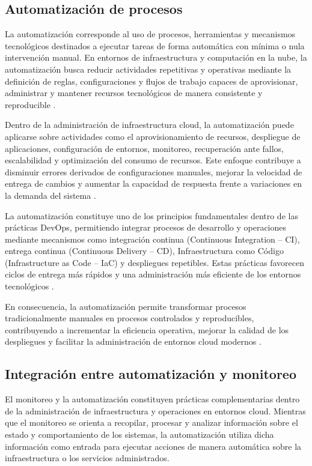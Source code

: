 \subsection{Automatización de procesos}

La automatización corresponde al uso de procesos, herramientas y mecanismos tecnológicos destinados a ejecutar tareas de forma automática con mínima o nula intervención manual. En entornos de infraestructura y computación en la nube, la automatización busca reducir actividades repetitivas y operativas mediante la definición de reglas, configuraciones y flujos de trabajo capaces de aprovisionar, administrar y mantener recursos tecnológicos de manera consistente y reproducible \parencite{RedHat2026}.

Dentro de la administración de infraestructura cloud, la automatización puede aplicarse sobre actividades como el aprovisionamiento de recursos, despliegue de aplicaciones, configuración de entornos, monitoreo, recuperación ante fallos, escalabilidad y optimización del consumo de recursos. Este enfoque contribuye a disminuir errores derivados de configuraciones manuales, mejorar la velocidad de entrega de cambios y aumentar la capacidad de respuesta frente a variaciones en la demanda del sistema \parencite{RedHat2026}.

La automatización constituye uno de los principios fundamentales dentro de las prácticas DevOps, permitiendo integrar procesos de desarrollo y operaciones mediante mecanismos como integración continua (Continuous Integration -- CI), entrega continua (Continuous Delivery -- CD), Infraestructura como Código (Infrastructure as Code -- IaC) y despliegues repetibles. Estas prácticas favorecen ciclos de entrega más rápidos y una administración más eficiente de los entornos tecnológicos \parencite{GoogleCloud2026}.

En consecuencia, la automatización permite transformar procesos tradicionalmente manuales en procesos controlados y reproducibles, contribuyendo a incrementar la eficiencia operativa, mejorar la calidad de los despliegues y facilitar la administración de entornos cloud modernos \parencite{RedHat2026, GoogleCloud2026}.

\subsection{Integración entre automatización y monitoreo}

El monitoreo y la automatización constituyen prácticas complementarias dentro de la administración de infraestructura y operaciones en entornos cloud. Mientras que el monitoreo se orienta a recopilar, procesar y analizar información sobre el estado y comportamiento de los sistemas, la automatización utiliza dicha información como entrada para ejecutar acciones de manera automática sobre la infraestructura o los servicios administrados.

